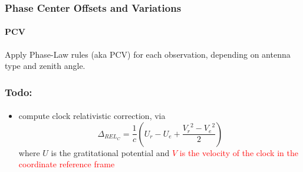 \documentclass{beamer}
\newcommand{\bitem}{\item[\textbullet]}
\begin{document}
\begin{frame}\frametitle{Phase Center Offsets and Variations}\framesubtitle{PCV}
  Apply Phase-Law rules (aka PCV) for each observation, depending on antenna type 
  and zenith angle.
\end{frame}

\begin{frame}\frametitle{Todo:}\framesubtitle{}
  \begin{itemize}
    \bitem compute clock relativistic correction, via 
    \begin{equation}
      \Delta_{REL_{C}} = \frac{1}{c}(U_r - U_e + \frac{{V_r}^2 -{V_e}^2}{2})
    \end{equation}
    where $U$ is the gratitational potential and \textcolor{red}{$V$ is the velocity of the clock in%
    the coordinate reference frame}
  \end{itemize}
\end{frame}



\end{document}
